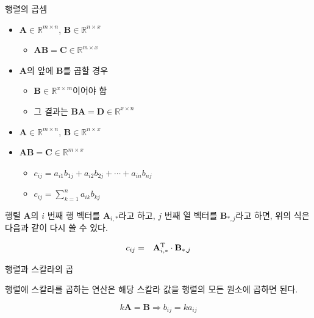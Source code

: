 \begin{frame}{행렬의 곱셈}

\begin{itemize}
\item $\mathbf A \in \mathbb R^{m \times n}$,  $\mathbf B \in \mathbb R^{n \times x}$
	\begin{itemize}
	\item $\mathbf {AB} = \mathbf C \in \mathbb R^{m \times x}$
	\end{itemize}
\end{itemize}

\begin{itemize}
\item $\mathbf A$의 앞에 $\mathbf B$를 곱할 경우
	\begin{itemize}
	\item $\mathbf B \in \mathbb R^{x \times m}$이어야 함
	\item 그 결과는 $\mathbf {BA} = \mathbf D \in \mathbb R^{x \times n}$
	\end{itemize}
\end{itemize}

\begin{itemize}
\item $\mathbf A \in \mathbb R^{m \times n}$, $\mathbf B \in \mathbb R^{n \times x}$
\item $\mathbf {AB} = \mathbf C \in \mathbb R^{m \times x}$
	\begin{itemize}
	\item $c_{ij}  =  a_{i1}b_{1j} + a_{i2}b_{2j} + \cdots + a_{in}b_{nj} $
	\item $c_{ij}  = \sum_{k=1}^n a_{ik} b_{kj}$
	\end{itemize}
\end{itemize}

행렬 $\mathbf A$의 $i$ 번째 행 벡터를 $\mathbf A_{i,*}$라고 하고, $j$ 번째 열 벡터를 $\mathbf B_{*,j}$라고 하면,
위의 식은 다음과 같이 다시 쓸 수 있다.

\begin{eqnarray}
c_{ij} & =  & \mathbf A_{i,*}^{\rm T} \cdot \mathbf B_{*,j}
\end{eqnarray}

\end{frame}


\begin{frame}{행렬과 스칼라의 곱}

행렬에 스칼라를 곱하는 연산은 해당 스칼라 값을 행렬의 모든 원소에 곱하면 된다.

$$k \mathbf A  = \mathbf B \Rightarrow b_{ij} = k a_{ij}$$

\end{frame}

